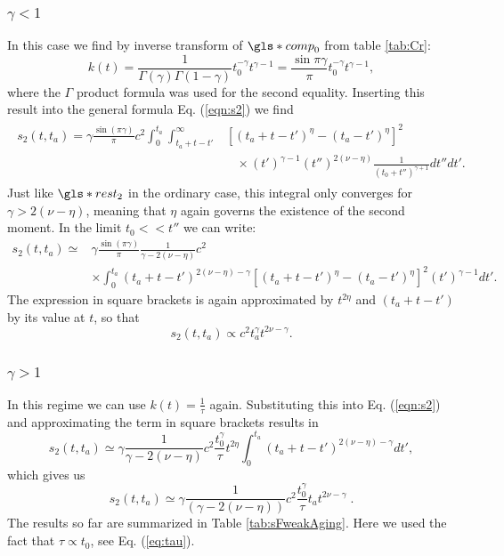 \subsubsection{$\gamma<1$}
In this case we find by inverse transform of $\gls*{comp}_0$ from table \ref{tab:Cr}:
\begin{equation}
 k(t) = \frac{1}{\Gamma(\gamma) \Gamma(1-\gamma)} t_0^{-\gamma} t^{\gamma-1} = \frac{\sin \pi \gamma}{\pi} t_0^{-\gamma} t^{\gamma-1} \label{eqn:kGammaSmall},
\end{equation}
%
where the $\Gamma$ product formula was used for the second equality. Inserting this result into the general formula Eq. (\ref{eqn:s2}) we find
\begin{align}
\begin{split}
s_2(t,t_a) = \gamma\frac{\sin(\pi \gamma)}{\pi}  c^2  \int_0^{t_a} \int^{\infty}_{t_a+t-t'} & [(t_a+t-t')^\eta-(t_a-t')^{\eta}]^2 \\
& \;\;\; \times   (t')^{\gamma-1}  (t'')^{2(\nu-\eta)} \frac{1}{(t_0+t'')^{\gamma+1}} dt'' dt' .
\end{split}
\end{align}
%
Just like $\gls*{rest}_2$ in the ordinary case, this integral only converges for $\gamma>2(\nu-\eta)$, meaning that $\eta$ again governs the existence of the second moment. In the limit $t_0<< t''$ we can write:
\begin{align}
s_2(t,t_a) \simeq &  \gamma\frac{\sin(\pi \gamma)}{\pi} \frac{ 1 }{\gamma-2(\nu-\eta)} c^2 \\
&   \times \int_0^{t_a} (t_a+t-t')^{2(\nu-\eta)-\gamma} [(t_a+t-t')^\eta-(t_a-t')^{\eta}]^2 (t')^{\gamma-1}  dt' \nonumber .
\end{align}
The expression in square brackets is again approximated by $t^{2\eta}$ and $(t_a+t-t')$ by its value at $t$, so that
\begin{equation}
 s_2(t,t_a) \propto c^2 t_a^\gamma t^{2\nu -\gamma}. 
\end{equation}

\subsubsection{$\gamma>1$}
In this regime we can use $k(t)=\frac{1}{\tau}$ again. Substituting this into Eq. (\ref{eqn:s2}) and  approximating the term in square brackets results in
%
\begin{equation}
s_2(t,t_a) \simeq \gamma \frac{1}{\gamma-2(\nu-\eta)}c^2 \frac{t_0^{\gamma}}{\tau} t^{2\eta} \int_{0}^{t_a} (t_a+t-t')^{2(\nu-\eta)-\gamma} dt'  ,
\end{equation}
%
which gives us
%
\begin{equation}
s_2(t,t_a) \simeq \gamma \frac{1}{(\gamma-2(\nu-\eta))} c^2\frac{t_0^{\gamma}}{\tau} t_a t^{2\nu-\gamma} \; .
\end{equation}
The results so far are summarized in Table \ref{tab:sFweakAging}. Here we used the fact that $\tau \propto t_0$, see Eq. (\ref{eq:tau}). 

